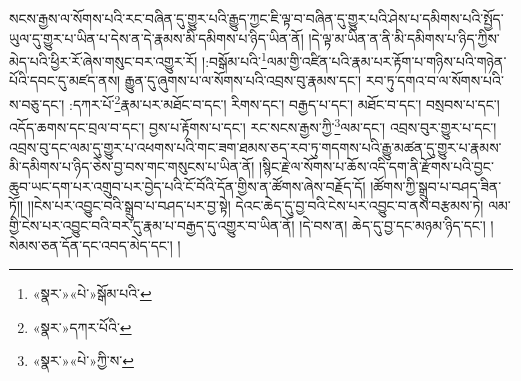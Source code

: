 སངས་རྒྱས་ལ་སོགས་པའི་རང་བཞིན་དུ་གྱུར་པའི་རྒྱུད་ཀྱང་ཇི་ལྟ་བ་བཞིན་དུ་གྱུར་པའི་ཤེས་པ་དམིགས་པའི་སྤྱོད་ཡུལ་དུ་གྱུར་པ་ཡིན་པ་དེས་ན་དེ་རྣམས་མི་དམིགས་པ་ཉིད་ཡིན་ནོ། །དེ་ལྟ་མ་ཡིན་ན་ནི་མི་དམིགས་པ་ཉིད་ཀྱིས་མེད་པའི་ཕྱིར་རོ་ཞེས་གསུང་བར་འགྱུར་རོ། །:བསྒོམ་པའི་\footnote{«སྣར་»«པེ་»སྒོམ་པའི་}ལམ་གྱི་འཛིན་པའི་རྣམ་པར་རྟོག་པ་གཉིས་པའི་གཉེན་པོའི་དབང་དུ་མཛད་ནས། རྒྱུན་དུ་ཞུགས་པ་ལ་སོགས་པའི་འབྲས་བུ་རྣམས་དང་། རབ་ཏུ་དགའ་བ་ལ་སོགས་པའི་ས་བཅུ་དང་། :དཀར་པོ་\footnote{«སྣར་»དཀར་པོའི་}རྣམ་པར་མཐོང་བ་དང་། རིགས་དང་། བརྒྱད་པ་དང་། མཐོང་བ་དང་། བསྲབས་པ་དང་། འདོད་ཆགས་དང་བྲལ་བ་དང་། བྱས་པ་རྟོགས་པ་དང་། རང་སངས་རྒྱས་ཀྱི་\footnote{«སྣར་»«པེ་»ཀྱི་ས་}ལམ་དང་། འབྲས་བུར་གྱུར་པ་དང་། འབྲས་བུ་དང་ལམ་དུ་གྱུར་པ་འཕགས་པའི་གང་ཟག་ཐམས་ཅད་རབ་ཏུ་གདགས་པའི་རྒྱུ་མཚན་དུ་གྱུར་པ་རྣམས་མི་དམིགས་པ་ཉིད་ཅེས་བྱ་བས་གང་གསུངས་པ་ཡིན་ནོ། །སྙིང་རྗེ་ལ་སོགས་པ་ཆོས་འདི་དག་ནི་རྫོགས་པའི་བྱང་ཆུབ་ཡང་དག་པར་འགྲུབ་པར་བྱེད་པའི་ངོ་བོའི་དོན་གྱིས་ན་ཚོགས་ཞེས་བརྗོད་དོ། །ཚོགས་ཀྱི་སྒྲུབ་པ་བཤད་ཟིན་ཏོ།། །།ངེས་པར་འབྱུང་བའི་སྒྲུབ་པ་བཤད་པར་བྱ་སྟེ། དེའང་ཆེད་དུ་བྱ་བའི་ངེས་པར་འབྱུང་བ་ནས་བརྩམས་ཏེ། ལམ་གྱི་ངེས་པར་འབྱུང་བའི་བར་དུ་རྣམ་པ་བརྒྱད་དུ་འགྱུར་བ་ཡིན་ནོ། །དེ་བས་ན། ཆེད་དུ་བྱ་དང་མཉམ་ཉིད་དང་། །སེམས་ཅན་དོན་དང་འབད་མེད་དང་། །
